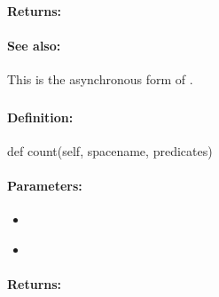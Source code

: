 \paragraph{Returns:}


\paragraph{See also:}  This is the asynchronous form of .

\pagebreak
\subsubsection{}
\label{api:python:count}


\paragraph{Definition:}
\begin{pythoncode}
def count(self, spacename, predicates)
\end{pythoncode}

\paragraph{Parameters:}
\begin{itemize}[noitemsep]
\item {}\\

\item {}\\

\end{itemize}

\paragraph{Returns:}


\pagebreak
\subsubsection{}
\label{api:python:async_count}


